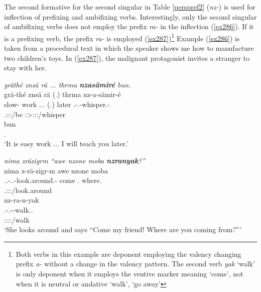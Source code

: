 The second formative for the second singular in Table \ref{perspref2} (\emph{nz-}) is used for  inflection of prefixing and ambifixing verbs. Interestingly, only the second  singular of ambifixing verbs does not employ the  prefix \emph{ra-} in the  inflection (\ref{ex286}). If it is a prefixing verb, the  prefix \emph{ra-} is employed (\ref{ex287})\footnote{Both verbs in this example are deponent employing the valency changing prefix \emph{a-} without a change in the valency pattern. The second verb \emph{yak} `walk' is only deponent when it employs the ventive marker meaning `come', not when it is neutral or andative `walk', `go away'} Example (\ref{ex286}) is taken from a procedural text in which the speaker shows me how to manufacture two children's toys. In (\ref{ex287}), the malignant protagonist invites a stranger to stay with her.

\begin{exe}
	\ex \emph{gräthé znsä rä ... thrma \textbf{nzasämiré} bun.}\\
	\glll grä-thé znsä rä (.) thrma nz-a-sämir-é\\
	slow-\Adlzr{} work \Tsg.\F.\Cop.\Ndu{} (.) later \Ssg.\Bet-\Vc.\Ndu-whisper.\Rs-\Fsg{}\\
	{} {} \footnotesize{\Tsg.\F:\Sbj:\Nonpast:\Ipfv/be} {} {} \footnotesize{\Fsg:\Sbj>\Ssg:\Io:\Irr:\Pfv/whisper}\\
	\sn
	\gll bun\\
	\Ssg.\Dat\\
	\trans `It is easy work ... I will teach you later.' 
	\label{ex286}
\end{exe}
\begin{exe}
	\ex \emph{nima zräzigrm ``awe nzone moba \textbf{nzranyak}?''}\\
	\glll nima z-rä-zigr-m awe nzone moba\\
	\Quot{} \Tsg.\F.\Bet-\Irr.\Vc.\Ndu-look.around.\Rs-\Dur{} come \Fsg.\Poss{} where.\Abl{}\\
	{} \footnotesize{\Tsg.\F:\Sbj:\Irr:\Pfv/look.around} {} {} {}\\
	\sn
	\glll nz-ra-n-yak\\
	\Ssg.\Bet-\Irr.\Vc-\Venit-walk.\Ext.\Ndu\\
	\footnotesize{\Ssg:\Sbj:\Irr:\Ipfv:\Venit/walk}\\
	\trans `She looks around and says ``Come my friend! Where are you coming from?''' 
	\label{ex287}
\end{exe}

